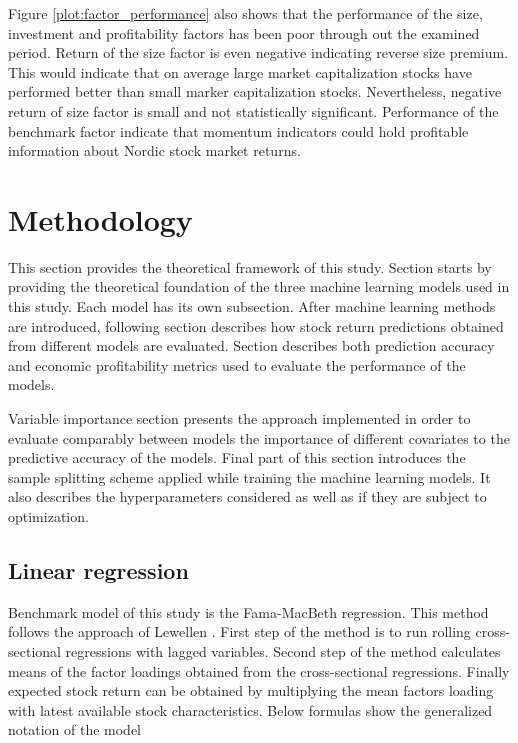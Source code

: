 \documentclass{article}
\begin{document}
Figure \ref{plot:factor_performance} also shows that the performance of the size, investment and profitability factors has been poor through out the examined period. Return of the size factor is even negative indicating reverse size premium. This would indicate that on average large market capitalization stocks have performed better than small marker capitalization stocks. Nevertheless, negative return of size factor is small and not statistically significant. Performance of the benchmark factor indicate that momentum indicators could hold profitable information about Nordic stock market returns. \par

\section{Methodology} \label{Methodology}

This section provides the theoretical framework of this study. Section starts by providing the theoretical foundation of the three machine learning models used in this study. Each model has its own subsection. After machine learning methods are introduced, following section describes how stock return predictions obtained from different models are evaluated. Section describes both prediction accuracy and economic profitability metrics used to evaluate the performance of the models. \par

Variable importance section presents the approach implemented in order to evaluate comparably between models the importance of different covariates to the predictive accuracy of the models. Final part of this section introduces the sample splitting scheme applied while training the machine learning models. It also describes the hyperparameters considered as well as if they are subject to optimization. \par

\subsection{Linear regression}\label{LinearRegression}
Benchmark model of this study is the Fama-MacBeth \citeyear{FamaMacBeth1973} regression. This method follows the approach of Lewellen \citeyear{Lewellen2015}. First step of the method is to run rolling cross-sectional regressions with lagged variables. Second step of the method calculates means of the factor loadings obtained from the cross-sectional regressions. Finally expected stock return can be obtained by multiplying the mean factors loading with latest available stock characteristics. Below formulas show the generalized notation of the model \par
\end{document}
